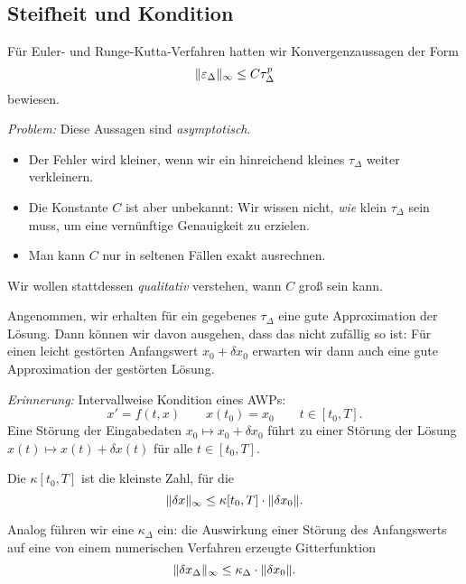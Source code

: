 \subsection{Steifheit und Kondition}

Für Euler- und Runge-Kutta-Verfahren hatten wir Konvergenzaussagen der Form
\begin{equation*}
	\lVert \varepsilon_\Delta \rVert_\infty\le C \tau_\Delta^p
\end{equation*}
bewiesen.

\emph{Problem:} Diese Aussagen sind \emph{asymptotisch}.
\begin{itemize}
	\item Der Fehler wird kleiner, wenn wir ein hinreichend kleines $\tau_\Delta$ weiter verkleinern.
	\item Die Konstante $C$ ist aber unbekannt: Wir wissen nicht, \emph{wie} klein $\tau_\Delta$ sein muss, um eine vernünftige Genauigkeit zu erzielen. 
	\item Man kann $C$ nur in seltenen Fällen exakt ausrechnen.
\end{itemize}

Wir wollen stattdessen \emph{qualitativ} verstehen, wann $C$ groß sein kann.

Angenommen, wir erhalten für ein gegebenes $\tau_\Delta$ eine gute Approximation der Lösung. 
Dann können wir davon ausgehen, dass das nicht zufällig so ist:  Für einen leicht gestörten Anfangswert $x_0 + \delta x_0$ erwarten wir dann auch eine gute Approximation der gestörten Lösung.


\emph{Erinnerung:} Intervallweise Kondition eines AWPs:
\begin{equation*}
	x'= f(t,x)
	\qquad
	x(t_0) = x_0
	\qquad
	t \in [t_0, T].
\end{equation*}
Eine Störung der Eingabedaten $x_0 \mapsto x_0 + \delta x_0$ führt zu einer Störung der Lösung $x(t) \mapsto x(t) + \delta x(t)$ für alle $t \in [t_0, T]$.

\begin{definition}
	Die  $\kappa [t_0,T]$ ist die kleinste Zahl, für die
	\begin{equation*}
		\lVert \delta x \rVert_\infty \le \kappa[t_0,T] \cdot \lVert \delta x_0 \rVert.
	\end{equation*}
\end{definition}

Analog führen wir eine  $\kappa_\Delta$ ein: die Auswirkung einer Störung des Anfangswerts auf eine von einem numerischen Verfahren erzeugte Gitterfunktion
\begin{equation*}
	\lVert \delta x_\Delta \rVert_\infty \le \kappa_\Delta \cdot \lVert \delta x_0 \rVert.
\end{equation*}

